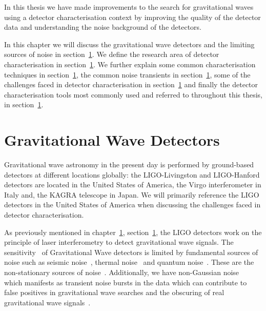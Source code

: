 



In this thesis we have made improvements to the search for gravitational waves using a detector characterisation context by improving the quality of the detector data and understanding the noise background of the detectors. 

In this chapter we will discuss the gravitational wave detectors and the limiting sources of noise in section~\ref{}. We define the research area of detector characterisation in section~\ref{}. We further explain some common characterisation techniques in section~\ref{}, the common noise transients in section~\ref{}, some of the challenges faced in detector characterisation in section~\ref{} and finally the detector characterisation tools most commonly used and referred to throughout this thesis, in section~\ref{}.

\section{\label{}Gravitational Wave Detectors}

Gravitational wave astronomy in the present day is performed by ground-based detectors at different locations globally: the LIGO-Livingston and LIGO-Hanford detectors are located in the United States of America, the Virgo interferometer in Italy and, the KAGRA telescope in Japan. We will primarily reference the LIGO detectors in the United States of America when discussing the challenges faced in detector characterisation. 

As previously mentioned in chapter~\ref{}, section~\ref{}, the LIGO detectors work on the principle of laser interferometry to detect gravitational wave signals. The sensitivity~\cite{aLIGO_design_curve:2018} of Gravitational Wave detectors is limited by fundamental sources of noise such as seismic noise~\cite{Glanzer:2023}, thermal noise~\cite{thermal_noise:2018} and quantum noise~\cite{quantum_noise:2003}. These are the non-stationary sources of noise~\cite{PSD_var:2020}. Additionally, we have non-Gaussian noise~\cite{Noise_Guide:2020} which manifests as transient noise bursts in the data which can contribute to false positives in gravitational wave searches and the obscuring of real gravitational wave signals~\cite{GW170817:2017, GW150914_noise:2016}.

